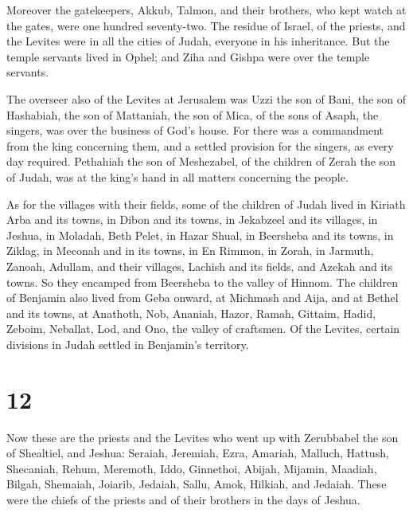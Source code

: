  Moreover the gatekeepers, Akkub, Talmon, and their
brothers, who kept watch at the gates, were one hundred seventy-two.
 The residue of Israel, of the priests, and the Levites
were in all the cities of Judah, everyone in his inheritance.
 But the temple servants lived in Ophel; and Ziha and
Gishpa were over the temple servants.

 The overseer also of the Levites at Jerusalem was Uzzi
the son of Bani, the son of Hashabiah, the son of Mattaniah, the son of
Mica, of the sons of Asaph, the singers, was over the business of God's
house.  For there was a commandment from the king
concerning them, and a settled provision for the singers, as every day
required.  Pethahiah the son of Meshezabel, of the
children of Zerah the son of Judah, was at the king's hand in all
matters concerning the people.

 As for the villages with their fields, some of the
children of Judah lived in Kiriath Arba and its towns, in Dibon and its
towns, in Jekabzeel and its villages,  in Jeshua, in
Moladah, Beth Pelet,  in Hazar Shual, in Beersheba and
its towns,  in Ziklag, in Meconah and in its towns,
 in En Rimmon, in Zorah, in Jarmuth, 
Zanoah, Adullam, and their villages, Lachish and its fields, and Azekah
and its towns. So they encamped from Beersheba to the valley of Hinnom.
 The children of Benjamin also lived from Geba onward, at
Michmash and Aija, and at Bethel and its towns,  at
Anathoth, Nob, Ananiah,  Hazor, Ramah, Gittaim,
 Hadid, Zeboim, Neballat,  Lod, and Ono,
the valley of craftsmen.  Of the Levites, certain
divisions in Judah settled in Benjamin's territory.

\hypertarget{section-11}{%
\section{12}\label{section-11}}

 Now these are the priests and the Levites who went up
with Zerubbabel the son of Shealtiel, and Jeshua: Seraiah, Jeremiah,
Ezra,  Amariah, Malluch, Hattush, 
Shecaniah, Rehum, Meremoth,  Iddo, Ginnethoi, Abijah,
 Mijamin, Maadiah, Bilgah,  Shemaiah,
Joiarib, Jedaiah,  Sallu, Amok, Hilkiah, and Jedaiah.
These were the chiefs of the priests and of their brothers in the days
of Jeshua.

